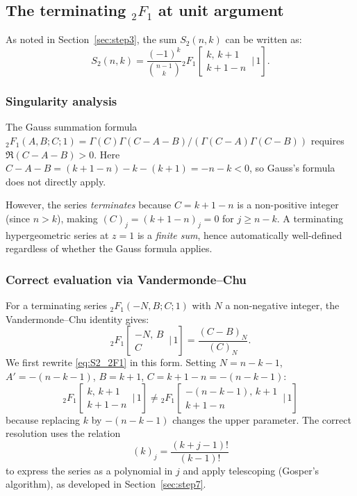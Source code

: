 \documentclass[12pt, a4paper]{amsart}
\theoremstyle{plain}
\theoremstyle{definition}
\theoremstyle{remark}
\newcommand{\C}{\mathcal{C}}
\newcommand{\F}{{}_2F_1}
\begin{document}
\subsection{The terminating ${}_2F_1$ at unit argument}

As noted in Section~\ref{sec:step3}, the sum $S_2(n,k)$ can be written as:
\begin{equation}\label{eq:S2_2F1}
  S_2(n,k)
  = \frac{(-1)^k}{\binom{n-1}{k}}
    \F\!\!\left[\begin{matrix}k,\,k+1\\k+1-n\end{matrix}\,\Bigg|\,1\right].
\end{equation}

\subsubsection*{Singularity analysis}

The Gauss summation formula $\F(A,B;C;1) = \Gamma(C)\Gamma(C-A-B)/(\Gamma(C-A)\Gamma(C-B))$
requires $\Re(C-A-B)>0$.  Here $C-A-B = (k+1-n)-k-(k+1)=-n-k<0$, so Gauss's
formula does not directly apply.

However, the series \emph{terminates} because $C = k+1-n$ is a non-positive integer
(since $n>k$), making $(C)_j = (k+1-n)_j = 0$ for $j\ge n-k$.  A terminating
hypergeometric series at $z=1$ is a \emph{finite sum}, hence automatically
well-defined regardless of whether the Gauss formula applies.

\subsubsection*{Correct evaluation via Vandermonde--Chu}

For a terminating series $\F(-N,B;C;1)$ with $N$ a non-negative integer, the
Vandermonde--Chu identity gives:
\begin{equation}\label{eq:vandermonde}
  \F\!\!\left[\begin{matrix}-N,\,B\\C\end{matrix}\,\Bigg|\,1\right]
  = \frac{(C-B)_N}{(C)_N}.
\end{equation}
We first rewrite \eqref{eq:S2_2F1} in this form.  Setting $N = n-k-1$,
$A' = -(n-k-1)$, $B = k+1$, $C = k+1-n = -(n-k-1)$:
\[
  \F\!\!\left[\begin{matrix}k,\,k+1\\k+1-n\end{matrix}\,\Bigg|\,1\right]
  \neq \F\!\!\left[\begin{matrix}-(n-k-1),\,k+1\\k+1-n\end{matrix}\,\Bigg|\,1\right]
\]
because replacing $k$ by $-(n-k-1)$ changes the upper parameter.  The correct
resolution uses the relation
\[
  (k)_j = \frac{(k+j-1)!}{(k-1)!}
\]
to express the series as a polynomial in $j$ and apply telescoping (Gosper's algorithm),
as developed in Section~\ref{sec:step7}.
\end{document}

